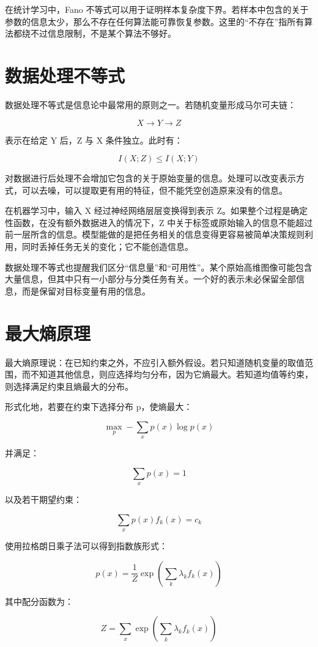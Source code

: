 在统计学习中，Fano 不等式可以用于证明样本复杂度下界。若样本中包含的关于参数的信息太少，那么不存在任何算法能可靠恢复参数。这里的“不存在”指所有算法都绕不过信息限制，不是某个算法不够好。

\section{数据处理不等式}

数据处理不等式是信息论中最常用的原则之一。若随机变量形成马尔可夫链：

\[
X\to Y\to Z
\]

表示在给定 Y 后，Z 与 X 条件独立。此时有：

\[
I(X;Z)\le I(X;Y)
\]

对数据进行后处理不会增加它包含的关于原始变量的信息。处理可以改变表示方式，可以去噪，可以提取更有用的特征，但不能凭空创造原来没有的信息。

在机器学习中，输入 X 经过神经网络层层变换得到表示 Z。如果整个过程是确定性函数，在没有额外数据进入的情况下，Z 中关于标签或原始输入的信息不能超过前一层所含的信息。模型能做的是把任务相关的信息变得更容易被简单决策规则利用，同时丢掉任务无关的变化；它不能创造信息。

数据处理不等式也提醒我们区分“信息量”和“可用性”。某个原始高维图像可能包含大量信息，但其中只有一小部分与分类任务有关。一个好的表示未必保留全部信息，而是保留对目标变量有用的信息。

\section{最大熵原理}

最大熵原理说：在已知约束之外，不应引入额外假设。若只知道随机变量的取值范围，而不知道其他信息，则应选择均匀分布，因为它熵最大。若知道均值等约束，则选择满足约束且熵最大的分布。

形式化地，若要在约束下选择分布 p，使熵最大：

\[
\max_p -\sum_x p(x)\log p(x)
\]

并满足：

\[
\sum_x p(x)=1
\]

以及若干期望约束：

\[
\sum_x p(x)f_k(x)=c_k
\]

使用拉格朗日乘子法可以得到指数族形式：

\[
p(x)=\frac{1}{Z}\exp\left(\sum_k \lambda_k f_k(x)\right)
\]

其中配分函数为：

\[
Z=\sum_x \exp\left(\sum_k \lambda_k f_k(x)\right)
\]

